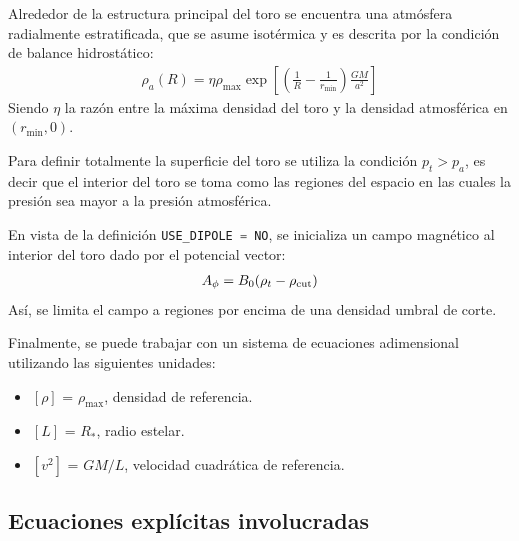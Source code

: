 \documentclass[11pt, letterpaper]{article}
\begin{document}
\medskip

Alrededor de la estructura principal del toro se encuentra una atmósfera radialmente estratificada, que se asume isotérmica y es descrita por la condición de balance hidrostático:
\begin{align}\label{eq:hydrostaticbalance}
    \rho_a(R) = \eta\rho_{\max}\exp\left[\left(\frac{1}{R}-\frac{1}{r_{\min}}\right)\frac{GM}{a^2}\right]    
\end{align}
Siendo $\eta$ la razón entre la máxima densidad del toro y la densidad atmosférica en $(r_{\min} , 0)$.

\medskip

Para definir totalmente la superficie del toro se utiliza la condición $p_t > p_a$, es decir que el interior del toro se toma como las regiones del espacio en las cuales la presión sea mayor a la presión atmosférica.

\medskip

En vista de la definición \lstinline[language=C]{USE_DIPOLE = NO}, se inicializa un campo magnético al interior del toro dado por el potencial vector:
\begin{align}\label{eq:magfield_vectorpot}
    A_\phi = B_0 (\rho_t - \rho_{\rm{cut}})
\end{align}
Así, se limita el campo a regiones por encima de una densidad umbral de corte.

\medskip

Finalmente, se puede trabajar con un sistema de ecuaciones adimensional utilizando las siguientes unidades:
\begin{itemize}
    \item $[\rho]$ = $\rho_{\max}$, densidad de referencia.
    \item $[L]$ = $R_*$, radio estelar.
    \item $[v^2]$ = $GM/L$, velocidad cuadrática de referencia.
\end{itemize}

\subsection{Ecuaciones explícitas involucradas}
\end{document}
